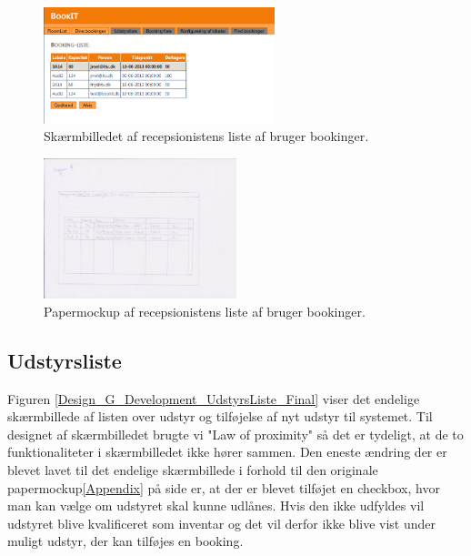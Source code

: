 \begin{figure}[h!]
  \centering
    \includegraphics[width=0.6\textwidth]{Appendix/GUI-Prototype/DigitalMockup/BookingListe}
  \caption{Skærmbilledet af recepsionistens liste af bruger bookinger.}
\label{Design_G_Development_BookingListe_Final}
\end{figure} 

\begin{figure}[h!]
  \centering
    \includegraphics[width=0.5\textwidth]{Appendix/GUI-Prototype/PaperMockup/GodkendBookinger_001}
  \caption{Papermockup af recepsionistens liste af bruger bookinger.}
\label{Design_G_Development_BookingListe}
\end{figure} 

\subsection{Udstyrsliste}
Figuren \ref{Design_G_Development_UdstyrsListe_Final} viser det endelige skærmbillede af listen over udstyr og tilføjelse af nyt udstyr til systemet. Til designet af skærmbilledet brugte vi "Law of proximity" så det er tydeligt, at de to funktionaliteter i skærmbilledet ikke hører sammen. Den eneste ændring der er blevet lavet til det endelige skærmbillede  i forhold til den originale papermockup\ref{Appendix} på side \pageref{Appendix} er, at der er blevet tilføjet en checkbox, hvor man kan vælge om udstyret skal kunne udlånes. Hvis den ikke udfyldes vil udstyret blive kvalificeret som inventar og det vil derfor ikke blive vist under muligt udstyr, der kan tilføjes en booking. 

